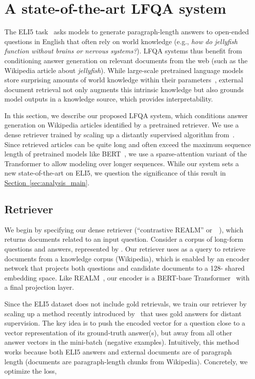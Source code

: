 \documentclass[11pt]{article}
\newcommand{\namedref}[2]{\hyperref[#2]{#1~\ref*{#2}}}
\newcommand{\sectionref}[1]{\namedref{Section}{#1}}
\newcommand{\retriever}[1]{\textsc{c-REALM}}
\begin{document}
 \section{A state-of-the-art LFQA system}\label{sec:model}
The ELI5 task~\citep{fan-etal-2019-eli5} asks models to generate paragraph-length answers to open-ended questions in English that often rely on world knowledge (e.g., \textit{how do jellyfish function without brains or nervous systems?}). LFQA systems thus benefit from conditioning answer generation on relevant documents from the web (such as the Wikipedia article about \textit{jellyfish}). While large-scale pretrained language models store surprising amounts of world knowledge within their parameters~\citep{petroni2019language, roberts2020much}, external document retrieval not only augments this intrinsic knowledge but also grounds model outputs in a knowledge source, which provides interpretability.

In this section, we describe our proposed LFQA system, which conditions answer generation on Wikipedia articles identified by a pretrained retriever. We use a dense retriever trained by scaling up a distantly supervised algorithm from~\citet{jernite2020}. Since retrieved articles can be quite long and often exceed the maximum sequence length of pretrained models like BERT~\citep{devlin-etal-2019-bert}, we use a sparse-attention variant of the Transformer to allow modeling over longer sequences. While our system sets a new state-of-the-art on ELI5, we question the significance of this result in \sectionref{sec:analysis_main}.

\subsection{Retriever}
We begin by specifying our dense retriever (``contrastive REALM'' or~\retriever~), which returns documents related to an input question.
Consider a corpus of long-form questions and answers, represented by . Our retriever uses  as a query to retrieve  documents  from a knowledge corpus (Wikipedia), which is enabled by an encoder network that projects both questions and candidate documents to a 128- shared embedding space. Like REALM~\citep{guu2020realm}, our encoder is a BERT-base Transformer~\citep{devlin-etal-2019-bert} with a final projection layer. 

Since the ELI5 dataset does not include gold retrievals, we train our retriever by scaling up a method recently introduced by~\citet{jernite2020} that uses gold answers for distant supervision. The key idea is to push the encoded vector for a question close to a vector representation of its ground-truth answer(s), but away from all other answer vectors in the mini-batch (negative examples). Intuitively, this method works because both ELI5 answers and external documents are of paragraph length (documents are paragraph-length chunks from Wikipedia). Concretely, we optimize the loss,
\end{document}
